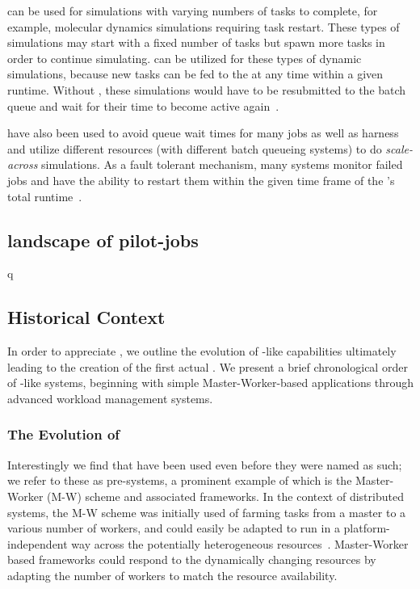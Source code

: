 \documentclass{sig-alternate}
\begin{document}
\pilotjobs can be used for  simulations
 with varying numbers of tasks to complete, for example,
molecular dynamics simulations requiring task restart. These types of 
 simulations may start with a fixed number of tasks but spawn 
 more tasks in order to continue simulating. \pilotjobs can be
utilized for these types of dynamic simulations, because 
new tasks can be fed to the \pilot at any time within a given 
runtime. Without \pilotjobs, these simulations would have to 
be resubmitted to the batch queue and wait for their time
to become active again~\cite{luckow2009adaptive}.

\pilotjobs have also been used to avoid queue wait times for many jobs
as well as harness and utilize different resources (with different
batch queueing systems) to do \textit{scale-across} simulations.
As a fault tolerant mechanism, many \pilotjob systems monitor
failed jobs and have the ability to restart them within the given 
time frame of the \pilotjob's total runtime~\cite{1742-6596-219-6-062049,condor-g,nilsson2011atlas}. 

\subsection{landscape of pilot-jobs}

q\subsection{Historical Context}

In order to appreciate \pilotjobs, we outline the evolution of
\pilot-like capabilities ultimately leading to the creation of the
first actual \pilotjob. We present a brief chronological order of
\pilotjob-like systems, beginning with simple Master-Worker-based
applications through advanced workload management systems.

\subsubsection*{The Evolution of \pilotjobs} 


Interestingly we find that \pilotjobs have been used even before they
were named as such; we refer to these as pre-\pilotjob systems, a
prominent example of which is the Master-Worker (M-W) scheme and
associated frameworks.  In the context of distributed systems, the M-W
scheme was initially used of farming tasks from a master to a various
number of workers, and could easily be adapted to run in a
platform-independent way across the potentially heterogeneous
resources~\cite{masterworker, Goux00anenabling}. Master-Worker based
frameworks could respond to the dynamically changing resources by
adapting the number of workers to match the resource availability.
\end{document}
